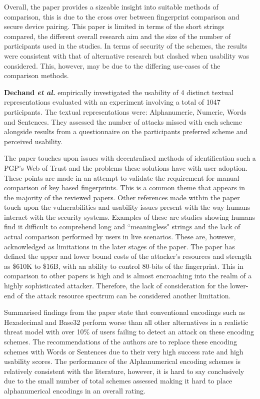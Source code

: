 Overall, the paper provides a sizeable insight into suitable methods of comparison, this is due to the cross over between fingerprint comparison and secure device pairing. This paper is limited in terms of the short strings compared, the different overall research aim and the size of the number of participants used in the studies. In terms of security of the schemes, the results were consistent with that of alternative research but clashed when usability was considered. This, however, may be due to the differing use-cases of the comparison methods.

\textbf{Dechand \textit{et al.}}\cite{dechand2016empirical} empirically investigated the usability of 4 distinct textual representations evaluated with an experiment involving a total of 1047 participants. The textual representations were: Alphanumeric, Numeric, Words and Sentences. They assessed the number of attacks missed with each scheme alongside results from a questionnaire on the participants preferred scheme and perceived usability.

The paper touches upon issues with decentralised methods of identification such a PGP's Web of Trust and the problems these solutions have with user adoption. These points are made in an attempt to validate the requirement for manual comparison of key based fingerprints. This is a common theme that appears in the majority of the reviewed papers. Other references made within the paper touch upon the vulnerabilities and usability issues present with the way humans interact with the security systems. Examples of these are studies showing humans find it difficult to comprehend long and ``meaningless" strings and the lack of actual comparison performed by users in live scenarios. These are, however, acknowledged as limitations in the later stages of the paper. The paper has defined the upper and lower bound costs of the attacker's resources and strength as \$610K to \$16B, with an ability to control 80-bits of the fingerprint. This in comparison to other papers is high and is almost encroaching into the realm of a highly sophisticated attacker. Therefore, the lack of consideration for the lower-end of the attack resource spectrum can be considered another limitation.

Summarised findings from the paper state that conventional encodings such as Hexadecimal and Base32 perform worse than all other alternatives in a realistic threat model with over 10\% of users failing to detect an attack on these encoding schemes. The recommendations of the authors are to replace these encoding schemes with Words or Sentences due to their very high success rate and high usability scores. The performance of the Alphanumerical encoding schemes is relatively consistent with the literature, however, it is hard to say conclusively due to the small number of total schemes assessed making it hard to place alphanumerical encodings in an overall rating.

